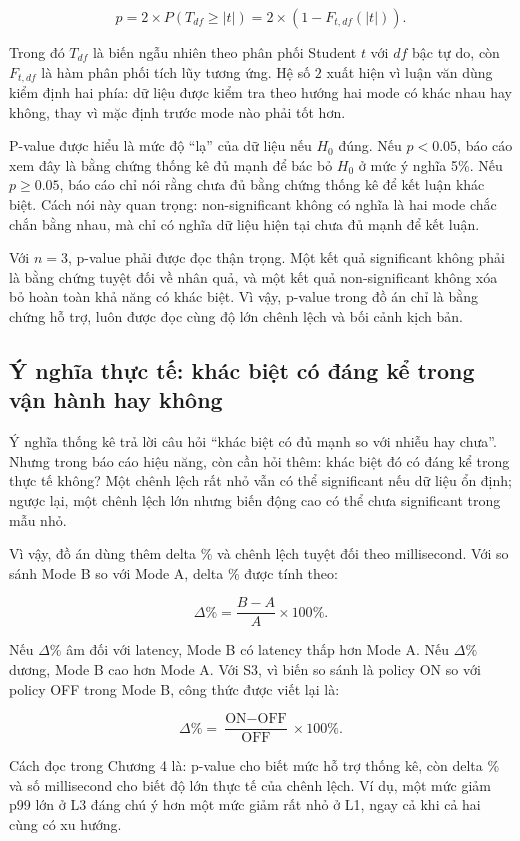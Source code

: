 \[
p = 2 \times P(T_{df} \ge |t|)
  = 2 \times \left(1 - F_{t,df}(|t|)\right).
\]

Trong đó \(T_{df}\) là biến ngẫu nhiên theo phân phối Student \(t\) với \(df\) bậc tự do, còn \(F_{t,df}\) là hàm phân phối tích lũy tương ứng. Hệ số \(2\) xuất hiện vì luận văn dùng kiểm định hai phía: dữ liệu được kiểm tra theo hướng hai mode có khác nhau hay không, thay vì mặc định trước mode nào phải tốt hơn.

P-value được hiểu là mức độ ``lạ'' của dữ liệu nếu \(H_0\) đúng. Nếu \(p < 0.05\), báo cáo xem đây là bằng chứng thống kê đủ mạnh để bác bỏ \(H_0\) ở mức ý nghĩa 5\%. Nếu \(p \ge 0.05\), báo cáo chỉ nói rằng chưa đủ bằng chứng thống kê để kết luận khác biệt. Cách nói này quan trọng: non-significant không có nghĩa là hai mode chắc chắn bằng nhau, mà chỉ có nghĩa dữ liệu hiện tại chưa đủ mạnh để kết luận.

Với \(n=3\), p-value phải được đọc thận trọng. Một kết quả significant không phải là bằng chứng tuyệt đối về nhân quả, và một kết quả non-significant không xóa bỏ hoàn toàn khả năng có khác biệt. Vì vậy, p-value trong đồ án chỉ là bằng chứng hỗ trợ, luôn được đọc cùng độ lớn chênh lệch và bối cảnh kịch bản.

\subsection{Ý nghĩa thực tế: khác biệt có đáng kể trong vận hành hay không}
Ý nghĩa thống kê trả lời câu hỏi ``khác biệt có đủ mạnh so với nhiễu hay chưa''. Nhưng trong báo cáo hiệu năng, còn cần hỏi thêm: khác biệt đó có đáng kể trong thực tế không? Một chênh lệch rất nhỏ vẫn có thể significant nếu dữ liệu ổn định; ngược lại, một chênh lệch lớn nhưng biến động cao có thể chưa significant trong mẫu nhỏ.

Vì vậy, đồ án dùng thêm delta \% và chênh lệch tuyệt đối theo millisecond. Với so sánh Mode B so với Mode A, delta \% được tính theo:

\[
\Delta\% = \frac{B - A}{A} \times 100\%.
\]

Nếu \(\Delta\%\) âm đối với latency, Mode B có latency thấp hơn Mode A. Nếu \(\Delta\%\) dương, Mode B cao hơn Mode A. Với S3, vì biến so sánh là policy ON so với policy OFF trong Mode B, công thức được viết lại là:

\[
\Delta\% = \frac{\text{ON} - \text{OFF}}{\text{OFF}} \times 100\%.
\]

Cách đọc trong Chương 4 là: p-value cho biết mức hỗ trợ thống kê, còn delta \% và số millisecond cho biết độ lớn thực tế của chênh lệch. Ví dụ, một mức giảm p99 lớn ở L3 đáng chú ý hơn một mức giảm rất nhỏ ở L1, ngay cả khi cả hai cùng có xu hướng.

